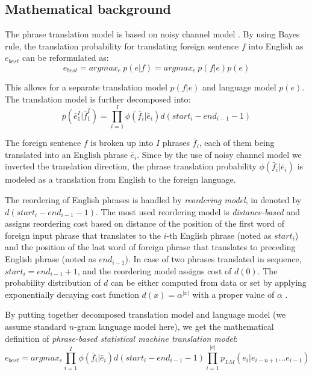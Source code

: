 \subsection{Mathematical background}

The phrase translation model is based on noisy channel model \citep{koehn:spbt}.
By using Bayes rule, the translation probability for translating foreign sentence $f$
into English as $e_{best}$ can be reformulated as:
\begin{equation}
  e_{best} = argmax_{e}~p(e|f) =  argmax_{e}~p(f|e)p(e)
\end{equation}

This allows for a separate translation model $p(f|e)$ and language model $p(e)$.
The translation model is further decomposed into:
\begin{equation} \label{eq:tm}
  p(\bar{e}_1^I|\bar{f}_1^I) = \prod_{i=1}^I \phi(\bar{f}_i|\bar{e}_i) d(start_i - end_{i-1} - 1)
\end{equation}

The foreign sentence $f$ is broken up into $I$ phrases $\bar{f}_i$, each of them
being translated into an English phrase $\bar{e}_i$. Since by the use of noisy channel
model we inverted the translation direction, the phrase translation probability
$\phi(\bar{f}_i|\bar{e}_i)$ is modeled as a translation from English to the foreign language.

The reordering of English phrases is handled by \emph{reordering model}, in 
denoted by $d(start_i - end_{i-1} - 1)$.
The most used reordering model is \emph{distance-based} and assigns reordering cost based
on distance of the position of the first word of foreign input phrase that translates to
the $i$-th English phrase (noted as $start_i$) and the position of the last word of foreign
phrase that translates to preceding English phrase (noted as $end_{i-1}$).
In case of two phrases translated in sequence, $start_i = end_{i-1} +1$, and the
reordering model assigns cost of $d(0)$.
The probability distribution of $d$ can be either computed from data or set by applying
exponentially decaying cost function $d(x) = \alpha^{|x|}$ with a proper value of $\alpha$
\citep{koehn:smt}.

By putting together decomposed translation model and language model (we assume standard $n$-gram
language model here), we get the mathematical definition of
\emph{phrase-based statistical machine translation model}:
\begin{equation} \label{eq:pbsmt}
  e_{best} = argmax_e \prod_{i=1}^I \phi(\bar{f}_i|\bar{e}_i) d(start_i - end_{i-1} - 1) \prod_{i=1}^{|e|} p_{LM}(e_i|e_{i-n+1}...e_{i-1})
\end{equation}

